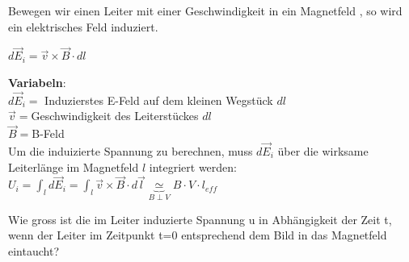 \newpage

\begingl
Bewegen wir einen Leiter mit einer Geschwindigkeit in ein Magnetfeld , so wird ein elektrisches Feld induziert.

\formulaBegin
$ \displaystyle d\vec{E}_i = \vec{v} \times \vec{B}  \cdot dl$
\formulaEnd

\textbf{Variabeln}: \\
$ d\vec{E}_i =$ Induzierstes E-Feld auf dem kleinen Wegstück $dl$ \\
$ \vec{v} = $Geschwindigkeit des Leiterstückes $ dl $ \\
$ \vec{B} = $B-Feld \\

Um die induizierte Spannung zu berechnen, muss $d\vec{E}_i$ über die wirksame Leiterlänge im Magnetfeld $l$ integriert werden: \\
\formulaBegin
$\displaystyle U_{i} = \int_l  d\vec{E}_i = \int_l \vec{v} \times \vec{B}  \cdot d\vec{l} \underbrace{\simeq}_{B \perp V} B \cdot V \cdot l_{eff}$
\formulaEnd

\iend



\beginbsp
  Wie gross ist die im Leiter induzierte Spannung u in Abhängigkeit der Zeit t, wenn der Leiter im Zeitpunkt t=0 entsprechend dem Bild in das Magnetfeld eintaucht?
\begin{center}
\end{center}
\iend
\newpage




